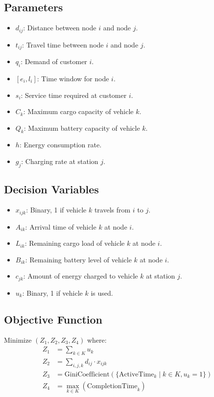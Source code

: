 \documentclass[a4paper,12pt]{article}
\begin{document}
\subsection{Parameters}
\begin{itemize}
    \item $d_{ij}$: Distance between node $i$ and node $j$.
    \item $t_{ij}$: Travel time between node $i$ and node $j$.
    \item $q_i$: Demand of customer $i$.
    \item $[e_i, l_i]$: Time window for node $i$.
    \item $s_i$: Service time required at customer $i$.
    \item $C_k$: Maximum cargo capacity of vehicle $k$.
    \item $Q_k$: Maximum battery capacity of vehicle $k$.
    \item $h$: Energy consumption rate.
    \item $g_j$: Charging rate at station $j$.
\end{itemize}

\subsection{Decision Variables}
\begin{itemize}
    \item $x_{ijk}$: Binary, 1 if vehicle $k$ travels from $i$ to $j$.
    \item $A_{ik}$: Arrival time of vehicle $k$ at node $i$.
    \item $L_{ik}$: Remaining cargo load of vehicle $k$ at node $i$.
    \item $B_{ik}$: Remaining battery level of vehicle $k$ at node $i$.
    \item $c_{jk}$: Amount of energy charged to vehicle $k$ at station $j$.
    \item $u_k$: Binary, 1 if vehicle $k$ is used.
\end{itemize}

\subsection{Objective Function}
Minimize $(Z_1, Z_2, Z_3, Z_4)$ where:
\begin{align}
    Z_1 &= \sum_{k \in K} u_k \\
    Z_2 &= \sum_{i,j,k} d_{ij} \cdot x_{ijk} \\
    Z_3 &= \text{GiniCoefficient}(\{\text{ActiveTime}_k \mid k \in K, u_k=1\}) \\
    Z_4 &= \max_{k \in K} (\text{CompletionTime}_k)
\end{align}
\end{document}

